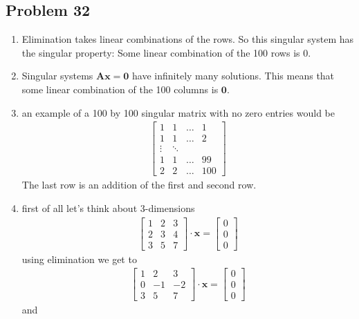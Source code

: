 \documentclass[a4paper,11pt]{article}
\newcommand{\mybf}[1]{\boldsymbol{#1}}
\begin{document}
\subsection*{Problem 32}
\begin{enumerate}[label=\alph*]
\item Elimination takes linear combinations of the rows. So this singular system has
the singular property: Some linear combination of the 100 rows is $0$.
\item Singular systems $\mybf{Ax} = \mybf{0}$ have infinitely many solutions. This means that some
linear combination of the 100 columns is $\mybf{0}$. 
\item an example of a 100 by 100 singular matrix with no zero entries would be
\begin{align}
\begin{bmatrix} 
    1 & 1 & \dots & 1\\
    1 & 1 & \dots & 2\\
    \vdots & \ddots & \\
    1 & 1 & \dots & 99\\
    2 & 2 & \dots & 100 
\end{bmatrix}
\end{align}
The last row is an addition of the first and second row.
\item first of all let's think about 3-dimensions
\begin{align}
\begin{bmatrix} 
    1 & 2 & 3\\
    2 & 3 & 4\\
    3 & 5 & 7 
\end{bmatrix}
\cdot
\mybf{x}
=
\begin{bmatrix} 
    0\\
    0\\
    0 
\end{bmatrix}
\end{align}
using elimination we get to
\begin{align}
\begin{bmatrix} 
    1 & 2 & 3\\
    0 & -1 & -2\\
    3 & 5 & 7 
\end{bmatrix}
\cdot
\mybf{x}
=
\begin{bmatrix} 
    0\\
    0\\
    0 
\end{bmatrix}
\end{align}
and
\begin{align}

\end{align}
\end{enumerate}
\end{document}
